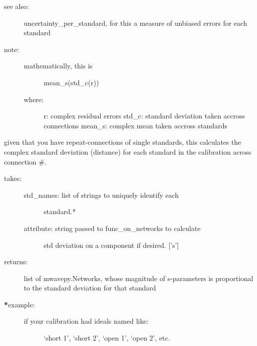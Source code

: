 \documentclass[letterpaper,10pt,english]{sphinxmanual}
\begin{document}
\begin{fulllineitems}
\begin{fulllineitems}
\begin{description}
\item[{see also:}] \leavevmode
uncertainty\_per\_standard, for this a measure of unbiased 
errors for each standard

\item[{note:}] \leavevmode\begin{description}
\item[{mathematically, this is }] \leavevmode
mean\_s(std\_c(r))

\item[{where:}] \leavevmode
r: complex residual errors
std\_c: standard deviation taken accross  connections
mean\_s: complex mean taken accross  standards

\end{description}

\end{description}

\end{fulllineitems}


\begin{fulllineitems}
\label{api/mwavepy.calibration:mwavepy.calibration.calibration.Calibration.uncertainty_per_standard}
given that you have repeat-connections of single standards, 
this calculates the complex standard deviation (distance) 
for each standard in the calibration across connection \#.
\begin{description}
\item[{takes:}] \leavevmode\begin{description}
\item[{std\_names: list of strings to uniquely identify each}] \leavevmode
standard.*

\item[{attribute: string passed to func\_on\_networks to calculate }] \leavevmode
std deviation on a component if desired. {[}'s'{]}

\end{description}

\item[{returns:}] \leavevmode
list of mwavepy.Networks, whose magnitude of s-parameters is
proportional to the standard deviation for that standard

\item[{{\color{red}\bfseries{}*}example:}] \leavevmode\begin{description}
\item[{if your calibration had ideals named like:}] \leavevmode
`short 1', `short 2', `open 1', `open 2', etc.


\end{description}
\end{description}
\end{fulllineitems}
\end{fulllineitems}
\end{document}
